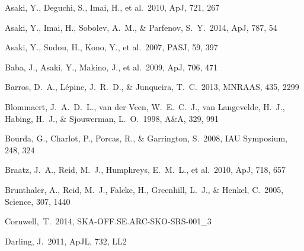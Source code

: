 \begin{thebibliography}{99}
\begin{multicols}{2}{\footnotesize

 Asaki, Y., Deguchi, S., Imai, H., et al.\ 2010, ApJ, 721, 267 

 Asaki, Y., Imai, H., Sobolev, A.~M., \& Parfenov, S.~Y.\ 2014, ApJ, 787, 54 

 Asaki, Y., Sudou, H., Kono, Y., et al.\ 2007, PASJ, 59, 397 

 Baba, J., Asaki, Y., Makino, J., et al.\ 2009, ApJ, 706, 471 

Barros, D.~A., L{\'e}pine, J.~R.~D., \& Junqueira, T.~C.\ 2013, MNRAAS, 435, 2299 



Blommaert, J.~A.~D.~L., van der Veen, W.~E.~C.~J., van Langevelde, H.~J., Habing, H.~J., \& Sjouwerman, L.~O.\ 1998, A\&A, 329, 991 

Bourda, G., Charlot, P., Porcas, R., \& Garrington, S.\ 2008, IAU Symposium, 248, 324 

 Braatz, J.~A., Reid, M.~J., Humphreys, E.~M.~L., et al.\ 2010, ApJ, 718, 657 

 Brunthaler, A., Reid, M.~J., Falcke, H., Greenhill, L.~J., 
\& Henkel, C.\ 2005, Science, 307, 1440 


Cornwell,~T.\ 2014, SKA-OFF.SE.ARC-SKO-SRS-001\_3

 Darling, J.\ 2011, ApJL, 732, LL2 

}
\end{multicols}
\end{thebibliography}
